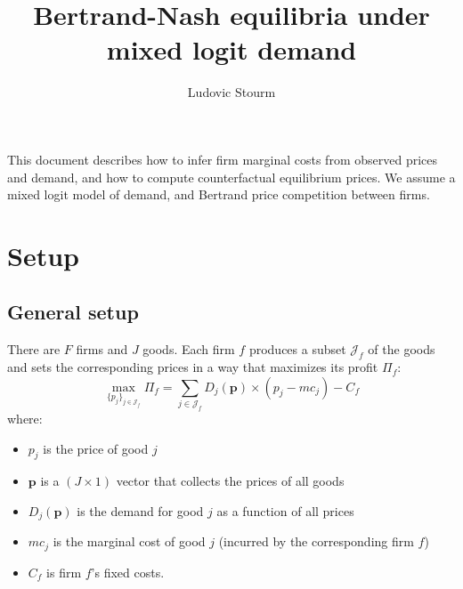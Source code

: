 \documentclass[12pt]{article}
\title{Bertrand-Nash equilibria under mixed logit demand}
\author{Ludovic Stourm}
\begin{document}
\maketitle

This document describes how to infer firm marginal costs from observed prices and demand, and how to compute counterfactual equilibrium prices. We assume a mixed logit model of demand, and Bertrand price competition between firms.

\section{Setup}
\subsection{General setup}
There are $F$ firms and $J$ goods. Each firm $f$ produces a subset $\mathcal{J}_f$ of the goods and sets the corresponding prices in a way that maximizes its profit $\Pi_f$:
\begin{equation}
	\underset{\{p_j\}_{j \in \mathcal{J}_f}}{\max} \Pi_f = \sum_{j \in \mathcal{J}_f} D_j(\textbf{p}) \times (p_j -mc_j) - C_f
\end{equation}
where:
\begin{itemize}
	\setlength\itemsep{0pt}
	\item $p_j$ is the price of good $j$
	\item $\textbf{p}$ is a $(J \times 1)$ vector that collects the prices of all goods
	\item $D_j(\textbf{p})$ is the demand for good $j$ as a function of all prices
	\item $mc_j$ is the marginal cost of good $j$ (incurred by the corresponding firm $f$)
	\item $C_f$ is firm $f$'s fixed costs.
\end{itemize}
\end{document}
